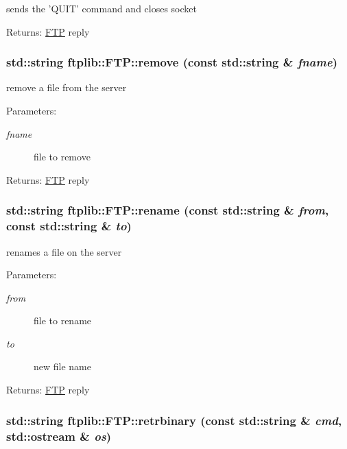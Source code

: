 sends the 'QUIT' command and closes socket 

\begin{Desc}
\item[Returns:]\hyperlink{classftplib_1_1FTP}{FTP} reply \end{Desc}
\hypertarget{classftplib_1_1FTP_00e0a674ee47139d6205cd95cef42e73}{
\subsubsection[{remove}]{\setlength{\rightskip}{0pt plus 5cm}std::string ftplib::FTP::remove (const std::string \& {\em fname})}}
\label{classftplib_1_1FTP_00e0a674ee47139d6205cd95cef42e73}


remove a file from the server 

\begin{Desc}
\item[Parameters:]
\begin{description}
\item[{\em fname}]file to remove \end{description}
\end{Desc}
\begin{Desc}
\item[Returns:]\hyperlink{classftplib_1_1FTP}{FTP} reply \end{Desc}
\hypertarget{classftplib_1_1FTP_0adece922028464ff064da24b539798d}{
\subsubsection[{rename}]{\setlength{\rightskip}{0pt plus 5cm}std::string ftplib::FTP::rename (const std::string \& {\em from}, \/  const std::string \& {\em to})}}
\label{classftplib_1_1FTP_0adece922028464ff064da24b539798d}


renames a file on the server 

\begin{Desc}
\item[Parameters:]
\begin{description}
\item[{\em from}]file to rename \item[{\em to}]new file name \end{description}
\end{Desc}
\begin{Desc}
\item[Returns:]\hyperlink{classftplib_1_1FTP}{FTP} reply \end{Desc}
\hypertarget{classftplib_1_1FTP_ad060fdb45fec7ccd5949e475df96982}{
\subsubsection[{retrbinary}]{\setlength{\rightskip}{0pt plus 5cm}std::string ftplib::FTP::retrbinary (const std::string \& {\em cmd}, \/  std::ostream \& {\em os})}}
\label{classftplib_1_1FTP_ad060fdb45fec7ccd5949e475df96982}


